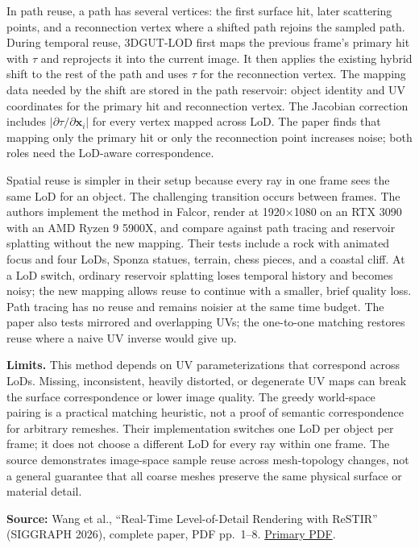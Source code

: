 In path reuse, a path has several vertices: the first surface hit, later scattering points, and a reconnection vertex where a shifted path rejoins the sampled path. During temporal reuse, 3DGUT-LOD first maps the previous frame's primary hit with \(\tau\) and reprojects it into the current image. It then applies the existing hybrid shift to the rest of the path and uses \(\tau\) for the reconnection vertex. The mapping data needed by the shift are stored in the path reservoir: object identity and UV coordinates for the primary hit and reconnection vertex. The Jacobian correction includes \(|\partial\tau/\partial\mathbf{x}_i|\) for every vertex mapped across LoD. The paper finds that mapping only the primary hit or only the reconnection point increases noise; both roles need the LoD-aware correspondence.

Spatial reuse is simpler in their setup because every ray in one frame sees the same LoD for an object. The challenging transition occurs between frames. The authors implement the method in Falcor, render at 1920×1080 on an RTX 3090 with an AMD Ryzen 9 5900X, and compare against path tracing and reservoir splatting without the new mapping. Their tests include a rock with animated focus and four LoDs, Sponza statues, terrain, chess pieces, and a coastal cliff. At a LoD switch, ordinary reservoir splatting loses temporal history and becomes noisy; the new mapping allows reuse to continue with a smaller, brief quality loss. Path tracing has no reuse and remains noisier at the same time budget. The paper also tests mirrored and overlapping UVs; the one-to-one matching restores reuse where a naive UV inverse would give up.

\textbf{Limits.} This method depends on UV parameterizations that correspond across LoDs. Missing, inconsistent, heavily distorted, or degenerate UV maps can break the surface correspondence or lower image quality. The greedy world-space pairing is a practical matching heuristic, not a proof of semantic correspondence for arbitrary remeshes. Their implementation switches one LoD per object per frame; it does not choose a different LoD for every ray within one frame. The source demonstrates image-space sample reuse across mesh-topology changes, not a general guarantee that all coarse meshes preserve the same physical surface or material detail.

\textbf{Source:} Wang et al., ``Real-Time Level-of-Detail Rendering with ReSTIR'' (SIGGRAPH 2026), complete paper, PDF pp.~1--8. \href{https://research.nvidia.com/labs/rtr/publication/wang2026levelOfDetail/wang2026levelOfDetail.pdf}{Primary PDF}.

